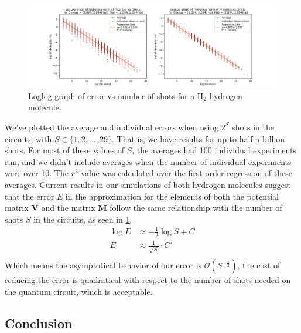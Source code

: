 \documentclass{aux/ttuthes2007}
\begin{document}
\begin{figure}[h!]
	\includegraphics[width=\linewidth]{img/2e-nonint.jpg}
  \caption{Loglog graph of error vs number of shots for a $\text{H}_2$ hydrogen molecule.}
  \label{fig:2derrorgraph}
\end{figure}

We've plotted the average and individual errors when using $2^S$ shots in the circuits, with $S \in \{1, 2, \ldots, 29\}$. That is, we have results for up to half a billion shots. For most of these values of $S$, the averages had 100 individual experiments run, and we didn't include averages when the number of individual experiments were over 10. The $r^2$ value was calculated over the first-order regression of these averages.
Current results in our simulations of both hydrogen molecules suggest that the error $E$ in the approximation for the elements of both the potential matrix $\bm V$ and the matrix $\bm M$ follow the same relationship with the number of shots $S$ in the circuits, as seen in \ref{fig:2derrorgraph}. 
%
\begin{equation*}
	\begin{split}
		\log E &\approx -\frac 1 2 \log S + C \\
		E &\approx \frac 1 {\sqrt{S}} \cdot C' \\
	\end{split}
\end{equation*}
%
Which means the asymptotical behavior of our error is $\mathcal O(S^{-\frac 1 2})$, the cost of reducing the error is quadratical with respect to the number of shots needed on the quantum circuit, which is acceptable.
%
\subsection{\textbf{Conclusion}}
\end{document}
